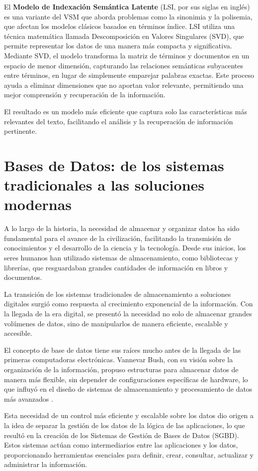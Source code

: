 El \textbf{Modelo de Indexación Semántica Latente} (LSI, por sus siglas en inglés) 
es una variante del VSM que aborda problemas como la sinonimia y la polisemia, 
que afectan los modelos clásicos basados en términos índice. LSI utiliza una 
técnica matemática llamada Descomposición en Valores Singulares (SVD), que permite 
representar los datos de una manera más compacta y significativa. Mediante SVD, 
el modelo transforma la matriz de términos y documentos en un espacio de menor 
dimensión, capturando las relaciones semánticas subyacentes entre términos, 
en lugar de simplemente emparejar palabras exactas. Este proceso ayuda a eliminar 
dimensiones que no aportan valor relevante, permitiendo una mejor comprensión y 
recuperación de la información.

El resultado es un modelo más eficiente que captura solo las características más 
relevantes del texto, facilitando el análisis y la recuperación de información pertinente.



\section{Bases de Datos: de los sistemas tradicionales a las soluciones modernas}
A lo largo de la historia, la necesidad de almacenar y organizar datos ha sido fundamental 
para el avance de la civilización, facilitando la transmisión de conocimientos y el 
desarrollo de la ciencia y la tecnología. Desde sus inicios, los seres humanos han 
utilizado sistemas de almacenamiento, como bibliotecas y librerías, que resguardaban 
grandes cantidades de información en libros y documentos.

La transición de los sistemas tradicionales de almacenamiento a soluciones digitales 
surgió como respuesta al crecimiento exponencial de la información. Con la llegada 
de la era digital, se presentó la necesidad no solo de almacenar grandes volúmenes 
de datos, sino de manipularlos de manera eficiente, escalable y accesible.

El concepto de base de datos tiene sus raíces mucho antes de la llegada de las primeras 
computadoras electrónicas. Vannevar Bush, con su visión sobre la organización de la 
información, propuso estructuras para almacenar datos de manera más flexible, 
sin depender de configuraciones específicas de hardware, lo que influyó en el diseño 
de sistemas de almacenamiento y procesamiento de datos más avanzados \cite{Taylor2001}.

Esta necesidad de un control más eficiente y escalable sobre los datos dio origen 
a la idea de separar la gestión de los datos de la lógica de las aplicaciones, 
lo que resultó en la creación de los Sistemas de Gestión de Bases de Datos (SGBD). 
Estos sistemas actúan como intermediarios entre las aplicaciones y los datos, 
proporcionando herramientas esenciales para definir, crear, consultar, actualizar y 
administrar la información.

